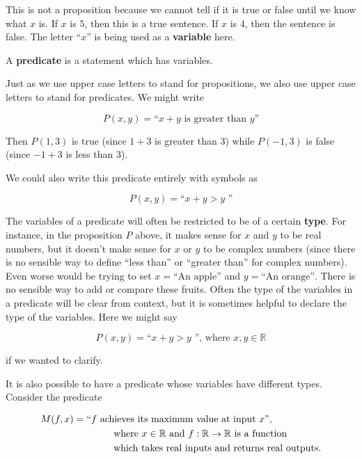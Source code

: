 This is not a proposition because we cannot tell if it is true or false until we know what $x$ is.  If $x$ is $5$, then this is a true sentence.  If $x$ is $4$, then the sentence is false.  The letter ``$x$'' is being used as a \textbf{variable} here.  

\begin{definition} 
A \textbf{predicate} is a statement which has variables.  
\end{definition}

Just as we use upper case letters to stand for propositions, we also use upper case letters to stand for predicates.   We might write

\[
P(x,y) =  \textrm{``$x+ y$ is greater than $y$''} 
\]

Then $P(1,3)$ is true (since $1+3$ is greater than $3$) while $P(-1,3)$ is false (since $-1+3$ is less than $3$).

We could also write this predicate entirely with symbols as 

\[
P(x,y) =  \textrm{``$x+ y > y$ ''} 
\]

The variables of a predicate will often be restricted to be of a certain \textbf{type}.  For instance, in the proposition $P$ above, it makes sense for $x$ and $y$ to be real numbers, but it doesn't make sense for $x$ or $y$ to be complex numbers (since there is no sensible way to define ``less than'' or ``greater than'' for complex numbers).  Even worse would be trying to set $x = \textrm{``An apple''}$ and $y = \textrm{``An orange''}$.  There is no sensible way to add or compare these fruits.  Often the type of the variables in a predicate will be clear from context, but it is sometimes helpful to declare the type of the variables.  Here we might say

\[
P(x,y) =  \textrm{``$x+ y > y$ '', where $x,y \in \mathbb{R}$} 
\]

if we wanted to clarify.

It is also possible to have a predicate whose variables have different types.  Consider the predicate

\begin{align*}
M(f,x) &=  \textrm{``$f$ achieves its maximum value at input $x$'',}\\ 
	&  \textrm{ \hphantom{fdsfdsds} where $x\in \mathbb{R}$ and $f: \mathbb{R} \to \mathbb{R}$ is a function} \\
	& \textrm{ \hphantom{fdsfdsds} which takes real inputs and returns real outputs.}
\end{align*}

